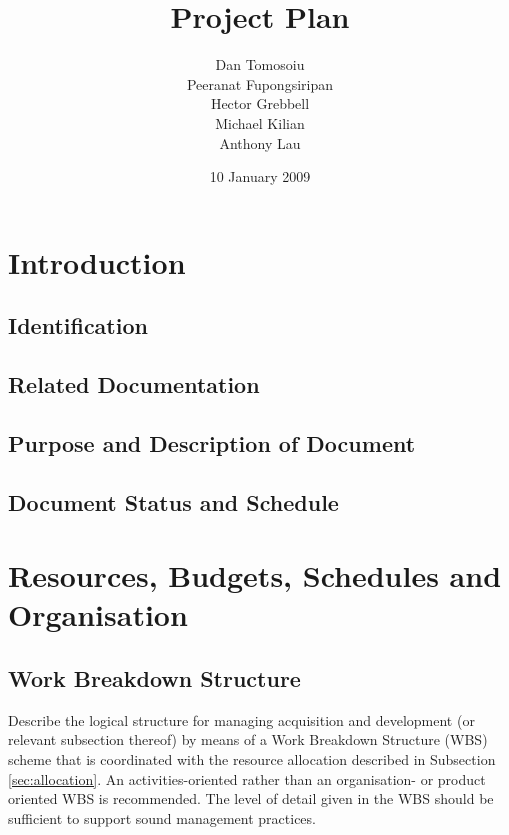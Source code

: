 \documentclass{l3deliverable}
\title{Project Plan}
\author{
  Dan Tomosoiu \\
  Peeranat Fupongsiripan \\
  Hector Grebbell \\
  Michael Kilian \\
  Anthony Lau \\
}
\date{10 January 2009}
\begin{document}

\maketitle

\tableofcontents

\newpage


\section{Introduction}

\subsection{Identification}

\subsection{Related Documentation}

\subsection{Purpose and Description of Document}

\subsection{Document Status and Schedule}


\section{Resources, Budgets, Schedules and Organisation}


\subsection{Work Breakdown Structure}

Describe the logical structure for managing acquisition and
development (or relevant subsection thereof) by means of a Work
Breakdown Structure (WBS) scheme that is coordinated with the resource
allocation described in Subsection \ref{sec:allocation}. An
activities-oriented rather than an organisation- or product oriented
WBS is recommended. The level of detail given in the WBS should be
sufficient to support sound management practices.
\end{document}
